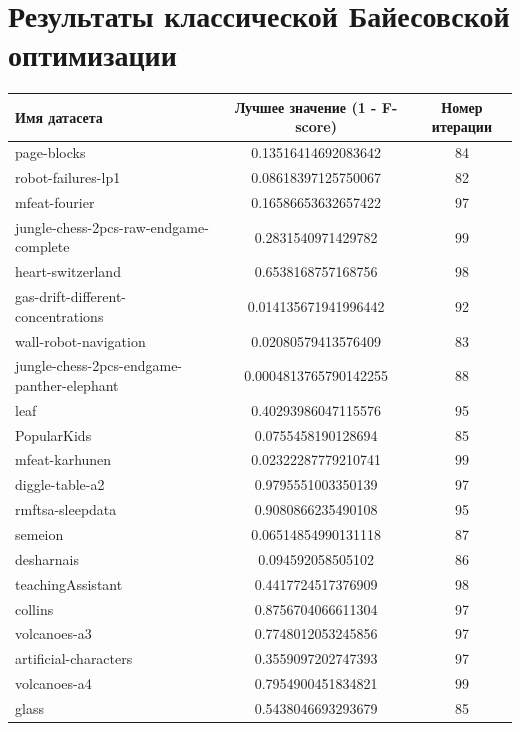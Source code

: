 \documentclass[times,specification,annotation]{itmo-student-thesis}
\begin{document}
	\chapter{Результаты классической Байесовской оптимизации}\label{app:bo-results}
	\begin{center}
		\begin{longtable}{ |m{5cm}|c|c| } 
			\hline
			\textbf{Имя датасета} & \textbf{Лучшее значение (1 - F-score)} & \textbf{Номер итерации} \\ 
			\hline\hline
			page-blocks & 0.13516414692083642 & 84 \\
			\hline
			robot-failures-lp1 & 0.08618397125750067 & 82 \\
			\hline
			mfeat-fourier & 0.16586653632657422 & 97 \\
			\hline
			jungle-chess-2pcs-raw-endgame-complete & 0.2831540971429782 & 99 \\
			\hline
			heart-switzerland & 0.6538168757168756 & 98 \\
			\hline
			gas-drift-different-concentrations & 0.014135671941996442 & 92 \\
			\hline
			wall-robot-navigation & 0.02080579413576409 & 83 \\
			\hline
			jungle-chess-2pcs-endgame-panther-elephant & 0.0004813765790142255 & 88 \\
			\hline
			leaf & 0.40293986047115576 & 95 \\
			\hline
			PopularKids & 0.0755458190128694 & 85 \\
			\hline
			mfeat-karhunen & 0.02322287779210741 & 99 \\
			\hline
			diggle-table-a2 & 0.9795551003350139 & 97 \\
			\hline
			rmftsa-sleepdata & 0.9080866235490108 & 95 \\
			\hline
			semeion & 0.06514854990131118 & 87 \\
			\hline
			desharnais & 0.094592058505102 & 86 \\
			\hline
			teachingAssistant & 0.4417724517376909 & 98 \\
			\hline
			collins & 0.8756704066611304 & 97 \\
			\hline
			volcanoes-a3 & 0.7748012053245856 & 97 \\
			\hline
			artificial-characters & 0.3559097202747393 & 97 \\
			\hline
			volcanoes-a4 & 0.7954900451834821 & 99 \\
			\hline
			glass & 0.5438046693293679 & 85 \\

\end{longtable}
\end{center}
\end{document}
